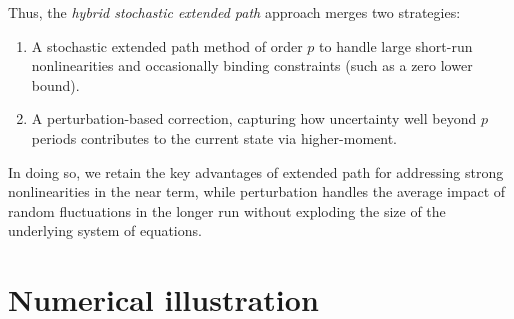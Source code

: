 \documentclass[a4paper,11pt]{amsart}
\begin{document}
Thus, the \emph{hybrid stochastic extended path} approach merges two strategies:\newline
\begin{enumerate}
   \item A stochastic extended path method of order $p$ to handle large short-run
         nonlinearities and occasionally binding constraints (such as a zero lower bound).\newline
   \item A perturbation-based correction, capturing how uncertainty well beyond
         $p$ periods contributes to the current state via higher-moment.\newline
\end{enumerate}

In doing so, we retain the key advantages of extended path for addressing strong
nonlinearities in the near term, while perturbation handles the average impact
of random fluctuations in the longer run without exploding the size of the
underlying system of equations.

\section{Numerical illustration}\label{sec:3}
\end{document}
